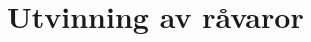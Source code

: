 \documentclass{article}
\begin{document}
\pagebreak
\newline
\pagebreak
\section{Utvinning av råvaror}



\end{document}
